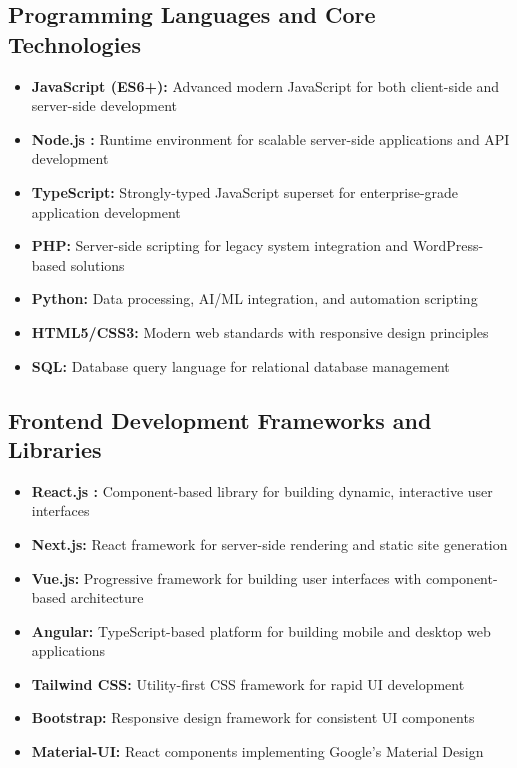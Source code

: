 \documentclass[12pt,a4paper]{report}
\newcommand{\tool}[1]{\textcolor{toolcolor}{\textbf{#1}}}
\let\oldcite\cite
\renewcommand{\cite}[1]{\textcolor{impactcolor}{\oldcite{#1}}}
\newenvironment{coloritemize}
{\begin{itemize}[label=\textcolor{primaryblue}{$\bullet$}]}
{\end{itemize}}
\begin{document}
\subsection{Programming Languages and Core Technologies}
\begin{coloritemize}
    \item \tool{JavaScript (ES6+):} Advanced modern JavaScript for both client-side and server-side development
    \item \tool{Node.js \cite{ref5}:} Runtime environment for scalable server-side applications and API development
    \item \tool{TypeScript:} Strongly-typed JavaScript superset for enterprise-grade application development
    \item \tool{PHP:} Server-side scripting for legacy system integration and WordPress-based solutions
    \item \tool{Python:} Data processing, AI/ML integration, and automation scripting
    \item \tool{HTML5/CSS3:} Modern web standards with responsive design principles
    \item \tool{SQL:} Database query language for relational database management
\end{coloritemize}

\newpage
\subsection{Frontend Development Frameworks and Libraries}
\begin{coloritemize}
    \item \tool{React.js \cite{ref3}:} Component-based library for building dynamic, interactive user interfaces
    \item \tool{Next.js:} React framework for server-side rendering and static site generation
    \item \tool{Vue.js:} Progressive framework for building user interfaces with component-based architecture
    \item \tool{Angular:} TypeScript-based platform for building mobile and desktop web applications
    \item \tool{Tailwind CSS:} Utility-first CSS framework for rapid UI development
    \item \tool{Bootstrap:} Responsive design framework for consistent UI components
    \item \tool{Material-UI:} React components implementing Google's Material Design
\end{coloritemize}
\end{document}
